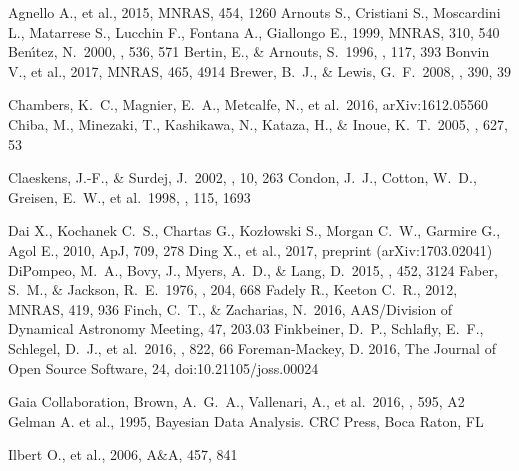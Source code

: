 \documentclass[manuscript]{aastex}
\begin{document}
\begin{thebibliography}{}

 Agnello A., et al., 2015, MNRAS, 454, 1260 
 Arnouts S., Cristiani S., Moscardini L., Matarrese S., Lucchin F., Fontana A., Giallongo E., 1999, MNRAS, 310, 540
 Ben{\'{\i}}tez, N.\ 2000, \apj, 536, 571 
 Bertin, E., \& Arnouts, S.\ 1996, \aaps, 117, 393 
 Bonvin V., et al., 2017, MNRAS, 465, 4914 
 Brewer, B.~J., \& Lewis, G.~F.\ 2008, \mnras, 390, 39 

 Chambers, K.~C., Magnier, E.~A., Metcalfe, N., et al.\ 2016, arXiv:1612.05560 
 Chiba, M., Minezaki, T., Kashikawa, N., Kataza, H., \& Inoue, K.~T.\ 2005, \apj, 627, 53 


 Claeskens, J.-F., \& Surdej, J.\ 2002, \aapr, 10, 263
 Condon, J.~J., Cotton, W.~D., Greisen, E.~W., et al.\ 1998, \aj, 115, 1693 

 Dai X., Kochanek C.~S., Chartas G., Koz{\l}owski S., Morgan C.~W., Garmire G., Agol E., 2010, ApJ, 709, 278 
 Ding X., et al., 2017, preprint (arXiv:1703.02041)
 DiPompeo, M.~A., Bovy, J., Myers, A.~D., \& Lang, D.\ 2015, \mnras, 452, 3124 
 Faber, S.~M., \& Jackson, R.~E.\ 1976, \apj, 204, 668 
 Fadely R., Keeton C.~R., 2012, MNRAS, 419, 936 
 Finch, C.~T., \& Zacharias, N.\ 2016, AAS/Division of Dynamical Astronomy Meeting, 47, 203.03 
 Finkbeiner, D.~P., Schlafly, E.~F., Schlegel, D.~J., et al.\ 2016, \apj, 822, 66
 Foreman-Mackey, D. 2016, The Journal of Open Source Software, 24, doi:10.21105/joss.00024

 Gaia Collaboration, Brown, A.~G.~A., Vallenari, A., et al.\ 2016, \aap, 595, A2 
 Gelman A. et al., 1995, Bayesian Data Analysis. CRC Press, Boca Raton, FL

 Ilbert O., et al., 2006, A\&A, 457, 841 


\end{thebibliography}
\end{document}
